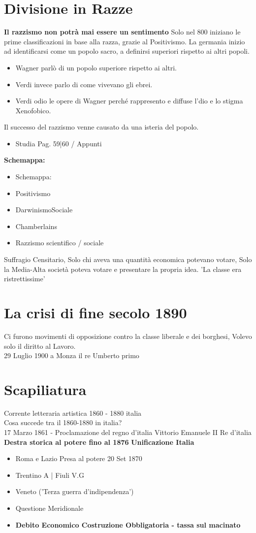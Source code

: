 \documentclass{article}
\begin{document}
\section{Divisione in Razze}
\textbf{Il razzismo non potrà mai essere un sentimento}
Solo nel 800 iniziano le prime classificazioni in base alla razza, grazie al Positivismo.
La germania inizio ad identificarsi come un popolo sacro, a definirsi superiori rispetto ai altri popoli.
\begin{itemize}
    \item Wagner parlò di un popolo superiore rispetto ai altri.
    \item Verdi invece parlo di come vivevano gli ebrei.
    \item Verdi odio le opere di Wagner perché rappresento e diffuse l'dio e lo stigma Xenofobico.
\end{itemize}
Il successo del razzismo venne causato da una isteria del popolo.
\begin{itemize}
    \item Studia Pag. 59|60 / Appunti
\end{itemize}
{\Large\textbf{Schemappa:}}
\begin{itemize}
\item Schemappa:
\item Positivismo
\item DarwinismoSociale
\item Chamberlains
\item Razzismo scientifico / sociale
\end{itemize}
Suffragio Censitario, Solo chi aveva una quantità economica potevano votare, Solo la Media-Alta società poteva
votare e presentare la propria idea. 'La classe era ristrettissime'
\section{La crisi di fine secolo 1890}
Ci furono movimenti di opposizione contro la classe liberale e dei borghesi, Volevo solo il diritto al Lavoro.\\
29 Luglio 1900 a Monza il re Umberto primo 

\section{Scapiliatura}
Corrente letteraria artistica 1860 - 1880 italia\\
Cosa succede tra il 1860-1880 in italia?\\
17 Marzo 1861 - Proclamazione del regno d'italia \textrightarrow Vittorio Emanuele II Re d'italia
\textbf{Destra storica al potere fino al 1876}
\textbf{Unificazione Italia}
\begin{itemize}
    \item Roma e Lazio \textrightarrow Presa al potere 20 Set 1870
    \item Trentino A | Fiuli V.G
    \item Veneto  ('Terza guerra d'indipendenza')
    \item Questione Meridionale
    \item \textbf{Debito Economico Costruzione Obbligatoria - tassa sul macinato}
\end{itemize}
\end{document}

